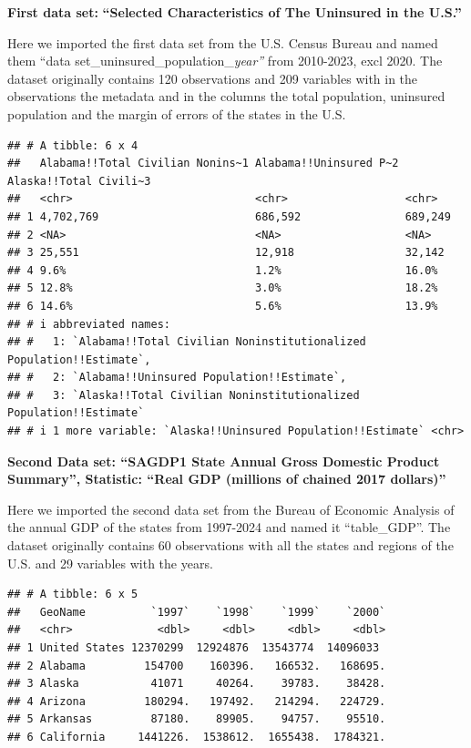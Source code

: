 \documentclass[
]{article}
\begin{document}
\textbf{First data set:} \textbf{``Selected Characteristics of The
Uninsured in the U.S.''}

Here we imported the first data set from the U.S. Census Bureau and
named them ``data set\_uninsured\_population\_\emph{year''} from
2010-2023, excl 2020. The dataset originally contains 120 observations
and 209 variables with in the observations the metadata and in the
columns the total population, uninsured population and the margin of
errors of the states in the U.S.

\begin{verbatim}
## # A tibble: 6 x 4
##   Alabama!!Total Civilian Nonins~1 Alabama!!Uninsured P~2 Alaska!!Total Civili~3
##   <chr>                            <chr>                  <chr>                 
## 1 4,702,769                        686,592                689,249               
## 2 <NA>                             <NA>                   <NA>                  
## 3 25,551                           12,918                 32,142                
## 4 9.6%                             1.2%                   16.0%                 
## 5 12.8%                            3.0%                   18.2%                 
## 6 14.6%                            5.6%                   13.9%                 
## # i abbreviated names:
## #   1: `Alabama!!Total Civilian Noninstitutionalized Population!!Estimate`,
## #   2: `Alabama!!Uninsured Population!!Estimate`,
## #   3: `Alaska!!Total Civilian Noninstitutionalized Population!!Estimate`
## # i 1 more variable: `Alaska!!Uninsured Population!!Estimate` <chr>
\end{verbatim}

\textbf{Second Data set: ``SAGDP1 State Annual Gross Domestic Product
Summary'', Statistic: ``Real GDP (millions of chained 2017 dollars)''}

Here we imported the second data set from the Bureau of Economic
Analysis of the annual GDP of the states from 1997-2024 and named it
``table\_GDP''. The dataset originally contains 60 observations with all
the states and regions of the U.S. and 29 variables with the years.

\begin{verbatim}
## # A tibble: 6 x 5
##   GeoName          `1997`    `1998`    `1999`    `2000`
##   <chr>             <dbl>     <dbl>     <dbl>     <dbl>
## 1 United States 12370299  12924876  13543774  14096033 
## 2 Alabama         154700    160396.   166532.   168695.
## 3 Alaska           41071     40264.    39783.    38428.
## 4 Arizona         180294.   197492.   214294.   224729.
## 5 Arkansas         87180.    89905.    94757.    95510.
## 6 California     1441226.  1538612.  1655438.  1784321.
\end{verbatim}
\end{document}
